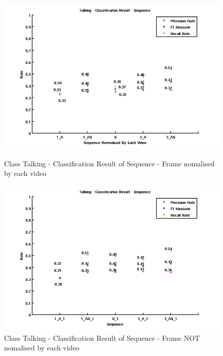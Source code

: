 \begin{figure}[ht]
\centering
\begin{minipage}{.5\textwidth}
  \centering
  \captionsetup{justification=centering,margin=1cm}
  \includegraphics[width=\linewidth]{imgs/Result_Talking_Sequence.png}
  \caption{Class Talking - Classification Result of Sequence - Frame nomalised by each video}
  \label{fig:RTS}
\end{minipage}%
\begin{minipage}{.5\textwidth}
  \centering
  \captionsetup{justification=centering,margin=1cm}
  \includegraphics[width=\linewidth]{imgs/Result_Talking_Sequence_1.png}
  \caption{Class Talking - Classification Result of Sequence - Frame NOT nomalised by each video}
  \label{fig:RTS1}
\end{minipage}
\end{figure}


